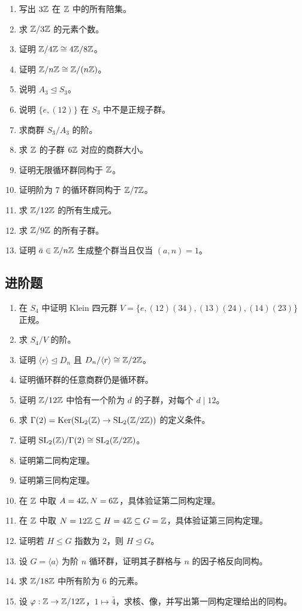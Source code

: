 \begin{enumerate}[label=\textbf{\arabic*.}, leftmargin=*, itemsep=0.5em]
\item \basic 写出 $3\mathbb{Z}$ 在 $\mathbb{Z}$ 中的所有陪集。
\item \basic 求 $\mathbb{Z}/3\mathbb{Z}$ 的元素个数。
\item \basic 证明 $\mathbb{Z}/4\mathbb{Z}\cong 4\mathbb{Z}/8\mathbb{Z}$。
\item \basic 证明 $\mathbb{Z}/n\mathbb{Z}\cong \mathbb{Z}/(n\mathbb{Z})$。
\item \basic 说明 $A_3\trianglelefteq S_3$。
\item \basic 说明 $\{e,(12)\}$ 在 $S_3$ 中不是正规子群。
\item \basic 求商群 $S_3/A_3$ 的阶。
\item \basic 求 $\mathbb{Z}$ 的子群 $6\mathbb{Z}$ 对应的商群大小。
\item \basic 证明无限循环群同构于 $\mathbb{Z}$。
\item \basic 证明阶为 $7$ 的循环群同构于 $\mathbb{Z}/7\mathbb{Z}$。
\item \basic 求 $\mathbb{Z}/12\mathbb{Z}$ 的所有生成元。
\item \basic 求 $\mathbb{Z}/9\mathbb{Z}$ 的所有子群。
\item \basic 证明 $\bar a\in \mathbb{Z}/n\mathbb{Z}$ 生成整个群当且仅当 $(a,n)=1$。
\end{enumerate}
\subsection*{进阶题}
\begin{enumerate}[resume, label=\textbf{\arabic*.}, leftmargin=*, itemsep=0.5em]
\item \medium 在 $S_4$ 中证明 Klein 四元群 $V=\{e,(12)(34),(13)(24),(14)(23)\}$ 正规。
\item \medium 求 $S_4/V$ 的阶。
\item \medium 证明 $\langle r\rangle\trianglelefteq D_n$ 且 $D_n/\langle r\rangle\cong \mathbb{Z}/2\mathbb{Z}$。
\item \medium 证明循环群的任意商群仍是循环群。
\item \medium 证明 $\mathbb{Z}/12\mathbb{Z}$ 中恰有一个阶为 $d$ 的子群，对每个 $d\mid12$。
\item \medium 求 $\Gamma(2)=\mathrm{Ker}(\mathrm{SL}_2(\mathbb{Z})\to \mathrm{SL}_2(\mathbb{Z}/2\mathbb{Z}))$ 的定义条件。
\item \medium 证明 $\mathrm{SL}_2(\mathbb{Z})/\Gamma(2)\cong \mathrm{SL}_2(\mathbb{Z}/2\mathbb{Z})$。
\item \medium 证明第二同构定理。
\item \medium 证明第三同构定理。
\item \medium 在 $\mathbb{Z}$ 中取 $A=4\mathbb{Z},N=6\mathbb{Z}$，具体验证第二同构定理。
\item \medium 在 $\mathbb{Z}$ 中取 $N=12\mathbb{Z}\subseteq H=4\mathbb{Z}\subseteq G=\mathbb{Z}$，具体验证第三同构定理。
\item \medium 证明若 $H\le G$ 指数为 $2$，则 $H\trianglelefteq G$。
\item \medium 设 $G=\langle a\rangle$ 为阶 $n$ 循环群，证明其子群格与 $n$ 的因子格反向同构。
\item \medium 求 $\mathbb{Z}/18\mathbb{Z}$ 中所有阶为 $6$ 的元素。
\item \medium 设 $\varphi:\mathbb{Z}\to \mathbb{Z}/12\mathbb{Z}$，$1\mapsto \bar4$，求核、像，并写出第一同构定理给出的同构。
\end{enumerate}
